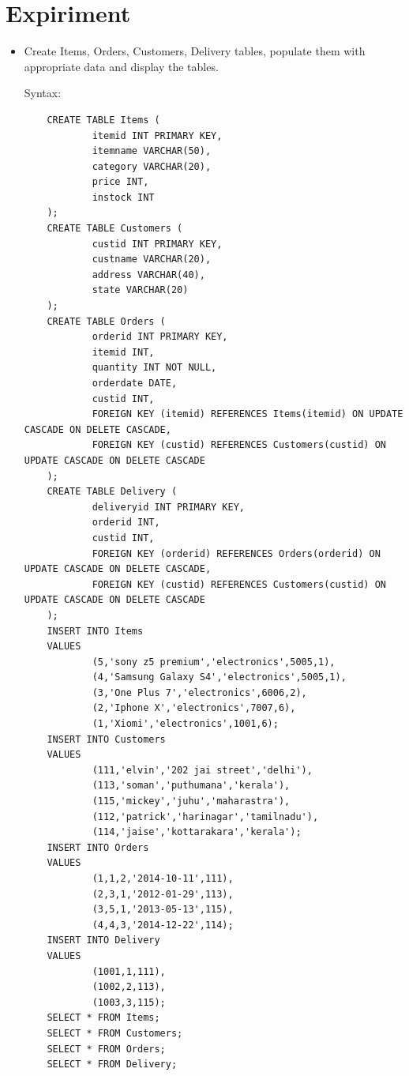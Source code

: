 \documentclass[13pt,oneside]{book}
\begin{document}
\section*{Expiriment}
\begin{itemize}
	\item
	Create Items, Orders, Customers, Delivery tables, populate them with appropriate data
	 and display the tables.
	 
	Syntax:
	\begin{verbatim}
	CREATE TABLE Items (
			itemid INT PRIMARY KEY,
			itemname VARCHAR(50),
			category VARCHAR(20),
			price INT,
			instock INT
	);
	CREATE TABLE Customers (
			custid INT PRIMARY KEY,
			custname VARCHAR(20),
			address VARCHAR(40),
			state VARCHAR(20)
	);
	CREATE TABLE Orders (
			orderid INT PRIMARY KEY,
			itemid INT,
			quantity INT NOT NULL,
			orderdate DATE,
			custid INT,
			FOREIGN KEY (itemid) REFERENCES Items(itemid) ON UPDATE CASCADE ON DELETE CASCADE,
			FOREIGN KEY (custid) REFERENCES Customers(custid) ON UPDATE CASCADE ON DELETE CASCADE 
	);
	CREATE TABLE Delivery (
			deliveryid INT PRIMARY KEY,
			orderid INT,
			custid INT,
			FOREIGN KEY (orderid) REFERENCES Orders(orderid) ON UPDATE CASCADE ON DELETE CASCADE,
			FOREIGN KEY (custid) REFERENCES Customers(custid) ON UPDATE CASCADE ON DELETE CASCADE 
	);
	INSERT INTO Items
	VALUES
			(5,'sony z5 premium','electronics',5005,1),
			(4,'Samsung Galaxy S4','electronics',5005,1),
			(3,'One Plus 7','electronics',6006,2),
			(2,'Iphone X','electronics',7007,6),
			(1,'Xiomi','electronics',1001,6);
	INSERT INTO Customers
	VALUES
			(111,'elvin','202 jai street','delhi'),
			(113,'soman','puthumana','kerala'),
			(115,'mickey','juhu','maharastra'),
			(112,'patrick','harinagar','tamilnadu'),
			(114,'jaise','kottarakara','kerala');
	INSERT INTO Orders
	VALUES
			(1,1,2,'2014-10-11',111),
			(2,3,1,'2012-01-29',113),
			(3,5,1,'2013-05-13',115),
			(4,4,3,'2014-12-22',114);
	INSERT INTO Delivery
	VALUES
			(1001,1,111),
			(1002,2,113),
			(1003,3,115);
	SELECT * FROM Items;
	SELECT * FROM Customers;
	SELECT * FROM Orders;
	SELECT * FROM Delivery;
	

\end{verbatim}
\end{itemize}
\end{document}
